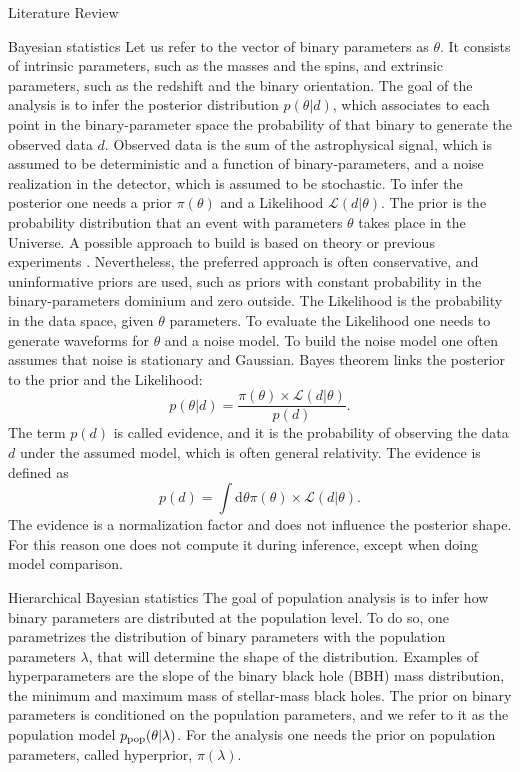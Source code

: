 \documentclass[a4paper, 12pt, twoside, openright, titlepage]{book}
\begin{document}
\begin{chapter}{Literature Review}
\begin{section}{Bayesian statistics}
Let us refer to the vector of binary parameters as $\theta$. It consists of intrinsic parameters, such as the masses and the spins, and extrinsic parameters, such as the redshift and the binary orientation.
The goal of the analysis is to infer the posterior distribution $p(\theta|d)$, which associates to each point in the binary-parameter space the probability of that binary to generate the observed data $d$. 
Observed data is the sum of the astrophysical signal, which is assumed to be deterministic and a function of binary-parameters, and a noise realization in the detector, which is assumed to be stochastic.
To infer the posterior one needs a prior $\pi(\theta)$ and a Likelihood $\mathcal{L}(d|\theta)$.
The prior is the probability distribution that an event with parameters $\theta$ takes place in the Universe. 
A possible approach to build is based on theory or previous experiments .
Nevertheless, the preferred approach is often conservative, and uninformative priors are used, such as priors with constant probability in the binary-parameters dominium and zero outside.
The Likelihood is the probability in the data space, given $\theta$ parameters.
To evaluate the Likelihood one needs to generate waveforms for $\theta$ and a noise model.
To build the noise model one often assumes that noise is stationary and Gaussian.
Bayes theorem links the posterior to the prior and the Likelihood:
\begin{equation}
\label{eq: post}
p(\theta|d) = \frac{ \pi(\theta) \times \mathcal{L}(d|\theta)}{p(d)}.
\end{equation}
The term $p(d)$ is called evidence, and it is the probability of observing the data $d$ under the assumed model, which is often general relativity.
The evidence is defined as
\begin{equation}
p(d) = \int\textrm{d}\theta \pi(\theta) \times \mathcal{L}(d|\theta).
\end{equation}
The evidence is a normalization factor and does not influence the posterior shape.
For this reason one does not compute it during inference, except when doing model comparison.


\end{section}


\begin{section}{Hierarchical Bayesian statistics}
The goal of population analysis is to infer how binary parameters are distributed at the population level. 
To do so, one parametrizes the distribution of binary parameters with the population parameters $\lambda$, that will determine the shape of the distribution. 
Examples of hyperparameters are the slope of the binary black hole (BBH) mass distribution, the minimum and maximum mass of stellar-mass black holes.
The prior on binary parameters is conditioned on the population parameters, and we refer to it as the population model $p_{\rm pop}(\theta|\lambda)$.
For the analysis one needs the prior on population parameters, called hyperprior, $\pi(\lambda)$.


\end{section}
\end{chapter}
\end{document}
